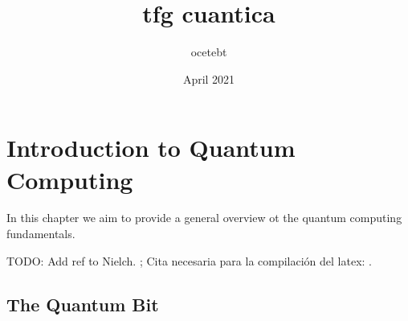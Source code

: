 
\chapter{Introduction to Quantum Computing}

In this chapter we aim to provide a general overview ot the quantum computing fundamentals.

TODO: Add ref to Nielch. ; Cita necesaria para la compilación del latex: 
\cite{Smith1981}.

\section{The Quantum Bit}



\documentclass{article}
\usepackage[utf8]{inputenc}

\title{tfg cuantica}
\author{ocetebt }
\date{April 2021}


	
	
	
	In this chapter we aim to provide a general overview to the quantum computing fundamentals required to understand. This development will be based on %
	
	\section{Intuitive notions}
	
